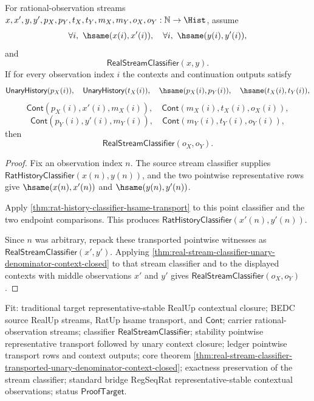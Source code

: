\begin{theorem}
\label{thm:real-stream-classifier-transported-unary-denominator-context-closed}
For rational-observation streams
$x,x',y,y',p_X,p_Y,t_X,t_Y,m_X,m_Y,o_X,o_Y:\mathbb{N}\to\Hist$, assume
$$
\forall i,\ \hsame(x(i),x'(i)),\quad
\forall i,\ \hsame(y(i),y'(i)),
$$
and
$$
\mathsf{RealStreamClassifier}(x,y).
$$
If for every observation index $i$ the contexts and continuation outputs
satisfy
$$
\mathsf{UnaryHistory}(p_X(i)),\quad \mathsf{UnaryHistory}(t_X(i)),\quad
\hsame(p_X(i),p_Y(i)),\quad \hsame(t_X(i),t_Y(i)),
$$
$$
\mathsf{Cont}(p_X(i),x'(i),m_X(i)),\quad
\mathsf{Cont}(m_X(i),t_X(i),o_X(i)),
$$
$$
\mathsf{Cont}(p_Y(i),y'(i),m_Y(i)),\quad
\mathsf{Cont}(m_Y(i),t_Y(i),o_Y(i)),
$$
then
$$
\mathsf{RealStreamClassifier}(o_X,o_Y).
$$
\end{theorem}
\begin{proof}
Fix an observation index $n$. The source stream classifier supplies
$\mathsf{RatHistoryClassifier}(x(n),y(n))$, and the two pointwise
representative rows give $\hsame(x(n),x'(n))$ and $\hsame(y(n),y'(n))$.

Apply \autoref{thm:rat-history-classifier-hsame-transport} to this point
classifier and the two endpoint comparisons. This produces
$\mathsf{RatHistoryClassifier}(x'(n),y'(n))$.

Since $n$ was arbitrary, repack these transported pointwise witnesses as
$\mathsf{RealStreamClassifier}(x',y')$. Applying
\autoref{thm:real-stream-classifier-unary-denominator-context-closed} to that
stream classifier and to the displayed contexts with middle observations
$x'$ and $y'$ gives $\mathsf{RealStreamClassifier}(o_X,o_Y)$.
\end{proof}

Fit: traditional target representative-stable RealUp contextual closure; BEDC
source RealUp streams, RatUp hsame transport, and $\mathsf{Cont}$; carrier
rational-observation streams; classifier $\mathsf{RealStreamClassifier}$;
stability pointwise representative transport followed by unary context closure;
ledger pointwise transport rows and context outputs; core theorem
\autoref{thm:real-stream-classifier-transported-unary-denominator-context-closed};
exactness preservation of the stream classifier; standard bridge RegSeqRat
representative-stable contextual observations; status $\mathsf{ProofTarget}$.

